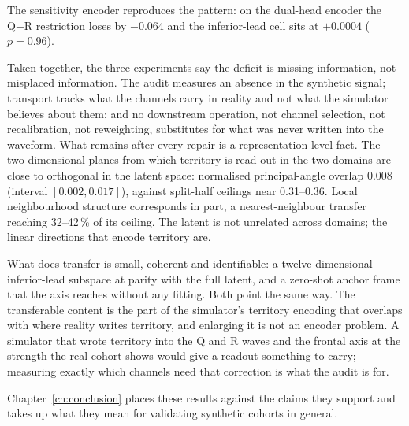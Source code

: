 The sensitivity encoder reproduces the pattern: on the dual-head encoder the Q+R restriction loses by $-0.064$ and the inferior-lead cell sits at $+0.0004$ ($p=0.96$). 

Taken together, the three experiments say the deficit is missing information, not misplaced information. The audit measures an absence in the synthetic signal; transport tracks what the channels carry in reality and not what the simulator believes about them; and no downstream operation, not channel selection, not recalibration, not reweighting, substitutes for what was never written into the waveform. What remains after every repair is a representation-level fact. The two-dimensional planes from which territory is read out in the two domains are close to orthogonal in the latent space: normalised principal-angle overlap 0.008 (interval $[0.002, 0.017]$), against split-half ceilings near 0.31--0.36. Local neighbourhood structure corresponds in part, a nearest-neighbour transfer reaching 32--42\,\% of its ceiling. The latent is not unrelated across domains; the linear directions that encode territory are. 

What does transfer is small, coherent and identifiable: a twelve-dimensional inferior-lead subspace at parity with the full latent, and a zero-shot anchor frame that the axis reaches without any fitting. Both point the same way. The transferable content is the part of the simulator's territory encoding that overlaps with where reality writes territory, and enlarging it is not an encoder problem. A simulator that wrote territory into the Q and R waves and the frontal axis at the strength the real cohort shows would give a readout something to carry; measuring exactly which channels need that correction is what the audit is for. 

Chapter~\ref{ch:conclusion} places these results against the claims they support and takes up what they mean for validating synthetic cohorts in general. 
